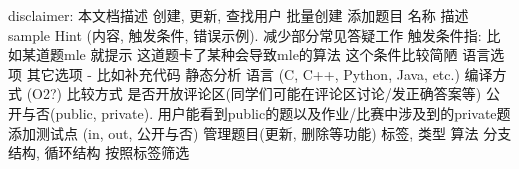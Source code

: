 \markdownRendererInterblockSeparator
{}disclaimer: 本文档描述\markdownRendererInterblockSeparator
{}\markdownRendererInterblockSeparator
{}\markdownRendererInterblockSeparator
{}\markdownRendererUlBeginTight
\markdownRendererUlItem 创建, 更新, 查找用户\markdownRendererUlItemEnd 
\markdownRendererUlItem 批量创建\markdownRendererUlItemEnd 
\markdownRendererUlEndTight \markdownRendererInterblockSeparator
{}\markdownRendererInterblockSeparator
{}\markdownRendererUlBeginTight
\markdownRendererUlItem 添加题目\markdownRendererUlItemEnd 
\markdownRendererUlItem 名称\markdownRendererUlItemEnd 
\markdownRendererUlItem 描述\markdownRendererUlItemEnd 
\markdownRendererUlItem sample\markdownRendererUlItemEnd 
\markdownRendererUlItem Hint (内容, 触发条件, 错误示例). 减少部分常见答疑工作\markdownRendererInterblockSeparator
{}\markdownRendererUlBeginTight
\markdownRendererUlItem 触发条件指: 比如某道题mle 就提示 这道题卡了某种会导致mle的算法\markdownRendererUlItemEnd 
\markdownRendererUlItem 这个条件比较简陋\markdownRendererUlItemEnd 
\markdownRendererUlEndTight \markdownRendererUlItemEnd 
\markdownRendererUlItem 语言选项\markdownRendererInterblockSeparator
{}\markdownRendererUlBeginTight
\markdownRendererUlItem 其它选项 - 比如补充代码\markdownRendererUlItemEnd 
\markdownRendererUlItem 静态分析\markdownRendererUlItemEnd 
\markdownRendererUlItem 语言 (C, C++, Python, Java, etc.)\markdownRendererUlItemEnd 
\markdownRendererUlItem 编译方式 (O2?)\markdownRendererUlItemEnd 
\markdownRendererUlItem 比较方式\markdownRendererUlItemEnd 
\markdownRendererUlEndTight \markdownRendererUlItemEnd 
\markdownRendererUlItem 是否开放评论区(同学们可能在评论区讨论/发正确答案等)\markdownRendererUlItemEnd 
\markdownRendererUlItem 公开与否(public, private). 用户能看到public的题以及作业/比赛中涉及到的private题\markdownRendererUlItemEnd 
\markdownRendererUlItem 添加测试点 (in, out, 公开与否)\markdownRendererUlItemEnd 
\markdownRendererUlItem 管理题目(更新, 删除等功能)\markdownRendererUlItemEnd 
\markdownRendererUlItem 标签, 类型\markdownRendererUlItemEnd 
\markdownRendererUlItem 算法\markdownRendererUlItemEnd 
\markdownRendererUlItem 分支结构, 循环结构\markdownRendererUlItemEnd 
\markdownRendererUlItem 按照标签筛选\markdownRendererUlItemEnd 
\markdownRendererUlEndTight \markdownRendererInterblockSeparator
{}\markdownRendererInterblockSeparator
